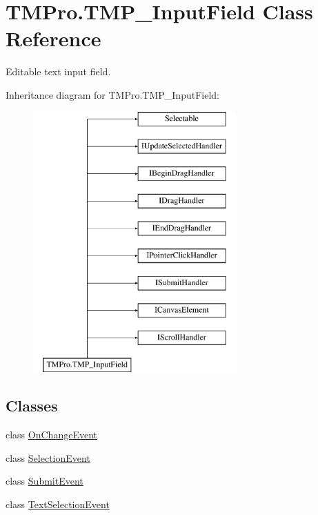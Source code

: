 \hypertarget{class_t_m_pro_1_1_t_m_p___input_field}{}\section{T\+M\+Pro.\+T\+M\+P\+\_\+\+Input\+Field Class Reference}
\label{class_t_m_pro_1_1_t_m_p___input_field}


Editable text input field.  


Inheritance diagram for T\+M\+Pro.\+T\+M\+P\+\_\+\+Input\+Field\+:\begin{figure}[H]
\begin{center}
\leavevmode
\includegraphics[height=10.000000cm]{class_t_m_pro_1_1_t_m_p___input_field}
\end{center}
\end{figure}
\subsection*{Classes}
\begin{DoxyCompactItemize}
\item 
class \mbox{\hyperlink{class_t_m_pro_1_1_t_m_p___input_field_1_1_on_change_event}{On\+Change\+Event}}
\item 
class \mbox{\hyperlink{class_t_m_pro_1_1_t_m_p___input_field_1_1_selection_event}{Selection\+Event}}
\item 
class \mbox{\hyperlink{class_t_m_pro_1_1_t_m_p___input_field_1_1_submit_event}{Submit\+Event}}
\item 
class \mbox{\hyperlink{class_t_m_pro_1_1_t_m_p___input_field_1_1_text_selection_event}{Text\+Selection\+Event}}
\end{DoxyCompactItemize}

